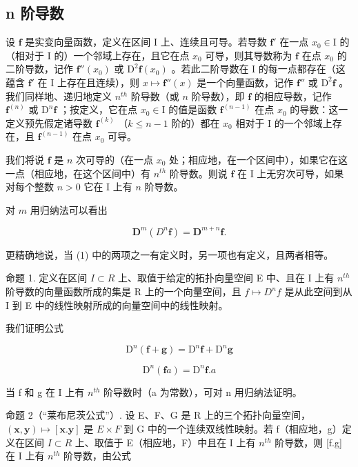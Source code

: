 \subsection{n 阶导数}

设 \(\mathbf{f}\) 是实变向量函数，定义在区间 I 上、连续且可导。若导数 \(\mathbf{f}'\) 在一点 \(x_0 \in \mathrm{I}\) 的（相对于 I 的）一个邻域上存在，且它在点 \(x_0\) 可导，则其导数称为 \(\mathbf{f}\) 在点 \(x_0\) 的二阶导数，记作 \(\mathbf{f}''(x_0)\) 或 \(\mathrm{D}^2\mathbf{f}(x_0)\) 。若此二阶导数在 I 的每一点都存在（这蕴含 \(\mathbf{f}'\) 在 I 上存在且连续），则 \(x \mapsto \mathbf{f}''(x)\) 是一个向量函数，记作 \(\mathbf{f}''\) 或 \(\mathrm{D}^2\mathbf{f}\) 。我们同样地、递归地定义 \(n^{th}\) 阶导数（或 \(n\) 阶导数），即 \(\mathbf{f}\) 的相应导数，记作 \(\mathbf{f}^{(n)}\) 或 \(\mathrm{D}^n\mathbf{f}\) ；按定义，它在点 \(x_0 \in \mathrm{I}\) 的值是函数 \(\mathbf{f}^{(n-1)}\) 在点 \(x_0\) 的导数：这一定义预先假定诸导数 \(\mathbf{f}^{(k)}\) （\(k \leqslant n - 1\) 阶的）都在 \(x_0\) 相对于 I 的一个邻域上存在，且 \(\mathbf{f}^{(n-1)}\) 在点 \(x_0\) 可导。

我们将说 \(\mathbf{f}\) 是 \(n\) 次可导的（在一点 \(x_0\) 处；相应地，在一个区间中），如果它在这一点（相应地，在这个区间中）有 \(n^{th}\) 阶导数。则说 \(\mathbf{f}\) 在 I 上无穷次可导，如果对每个整数 \(n > 0\) 它在 I 上有 \(n\) 阶导数。

对 \(m\) 用归纳法可以看出

\[
\mathbf {D} ^ {m} (D ^ {n} \mathbf {f}) = \mathbf {D} ^ {m + n} \mathbf {f}.\tag{1}
\]

更精确地说，当 (1) 中的两项之一有定义时，另一项也有定义，且两者相等。

命题 1. 定义在区间 \(I \subset R\) 上、取值于给定的拓扑向量空间 E 中、且在 I 上有 \(n^{th}\) 阶导数的向量函数所成的集是 R 上的一个向量空间，且 \(f \mapsto D^{n}f\) 是从此空间到从 I 到 E 中的线性映射所成的向量空间中的线性映射。

我们证明公式

\[
\mathrm{D} ^ {n} (\mathbf {f} + \mathbf {g}) = \mathrm{D} ^ {n} \mathbf {f} + \mathrm{D} ^ {n} \mathbf {g}\tag{2}
\]

\[
\mathrm{D} ^ {n} (\mathbf {f} a) = \mathrm{D} ^ {n} \mathbf {f}. a\tag{3}
\]

当 f 和 g 在 I 上有 \(n^{th}\) 阶导数时（a 为常数），可对 n 用归纳法证明。

命题 2（“莱布尼茨公式”）. 设 E、F、G 是 R 上的三个拓扑向量空间，\((\mathbf{x}, \mathbf{y}) \mapsto [\mathbf{x}.\mathbf{y}]\) 是 \(E \times F\) 到 G 中的一个连续双线性映射。若 f（相应地，g）定义在区间 \(I \subset R\) 上、取值于 E（相应地，F）中且在 I 上有 \(n^{th}\) 阶导数，则 {[}f.g{]} 在 I 上有 \(n^{th}\) 阶导数，由公式

